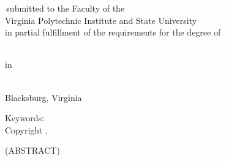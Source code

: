\documentclass[12pt]{report}
\begin{document}
\thispagestyle{empty}


\begin{center}



{\Large
\mytitle
}


\vfill


\myauthor


\vfill


\myreporttype \,submitted to the Faculty of the \\
Virginia Polytechnic Institute and State University \\
in partial fulfillment of the requirements for the degree of


\vfill


\mydegree \\
in \\
\mydepartment


\vfill


\mycommittee


\vfill


\mydate \\
Blacksburg, Virginia


\vfill


Keywords: \mykeywords \\
Copyright \myyear, \myauthor


\end{center}


\pagebreak


\thispagestyle{empty}

\begin{center}


{\large \mytitle}


\vfill


\myauthor


\vfill


(ABSTRACT)


\vfill


\end{center}

\myabstract


\vfill


\ifx\mygrants\undefined
\else
  \mygrants
\fi

\pagebreak


\ifx\mydedication\undefined
\else
\end{document}
